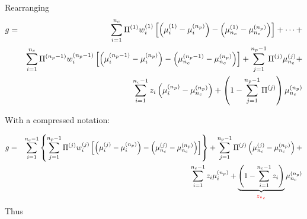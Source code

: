 Rearranging
\begin{eqnarray}
g &=& \summation_{i=1}^{n_{c}}\mfr[\Pi]{}{1}\mfr[w]{i}{1}\left[\left(\mfr[\mu]{i}{1}-\mfr[\mu]{i}{n_{p}}\right) - \left(\mfr[\mu]{n_{c}}{1}-\mfr[\mu]{n_{c}}{n_{p}}\right)\right] + \cdots +  
\nonumber \\
&& \summation_{i=1}^{n_{c}}\mfr[\Pi]{}{n_{p}-1}\mfr[w]{i}{n_{p}-1}\left[\left(\mfr[\mu]{i}{n_{p}-1}-\mfr[\mu]{i}{n_{p}}\right) - \left(\mfr[\mu]{n_{c}}{n_{p}-1}-\mfr[\mu]{n_{c}}{n_{p}}\right)\right] + \summation_{j=1}^{n_{p}-1}\Pi^{(j)}\mfr[\mu]{n_{c}}{j} + \nonumber \\
&& \summation_{i=1}^{n_{c}-1}z_{i}\left(\mfr[\mu]{i}{n_{p}}-\mfr[\mu]{n_{c}}{n_{p}}\right) +\left(1-\summation_{j=1}^{n_{p}-1}\Pi^{(j)}\right)\mfr[\mu]{n_{c}}{n_{p}} \nonumber
\end{eqnarray}

With a compressed notation:

\begin{eqnarray}
g &=& \summation_{i=1}^{n_{c}-1}\left\{\summation_{j=1}^{n_{p}-1}\Pi^{(j)}\mfr[w]{i}{j}\left[\left(\mfr[\mu]{i}{j}-\mfr[\mu]{i}{n_{p}}\right) - \left(\mfr[\mu]{n_{c}}{j}-\mfr[\mu]{n_{c}}{n_{p}}\right)\right]\right\} + \summation_{j=1}^{n_{p}-1}\Pi^{(j)}\left(\mfr[\mu]{n_{c}}{j}-\mfr[\mu]{n_{c}}{n_{p}}\right) +  \nonumber \\
&& \hspace{3cm} \summation_{i=1}^{n_{c}-1} z_{i}\mfr[\mu]{i}{n_{p}} + \underbrace{\left(1-\summation_{i=1}^{n_{c}-1}z_{i}\right)}_{\red{z_{n_{c}}}}\mfr[\mu]{n_{c}}{n_{p}} \nonumber 
\end{eqnarray}
Thus

